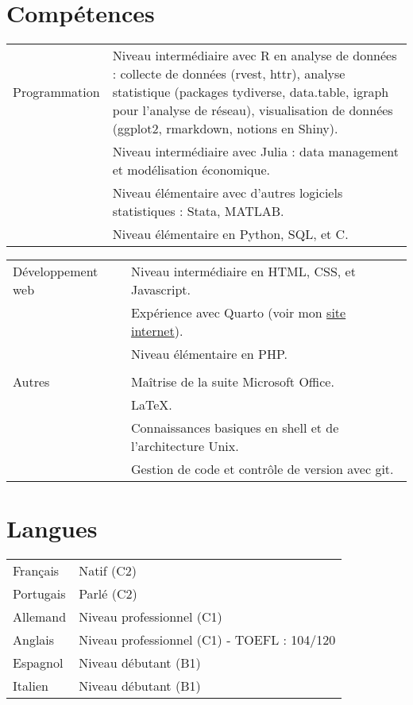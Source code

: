 \documentclass[a4paper,12pt]{article}
\begin{document}
\section{Compétences}
\begin{tabularx}{\linewidth}{@{}l X@{}}
Programmation \quad \quad & Niveau intermédiaire avec R en analyse de données :
collecte de données (rvest, httr),
analyse statistique (packages tydiverse, data.table, igraph pour l'analyse de réseau),
visualisation de données (ggplot2, rmarkdown, notions en Shiny). \\
& Niveau intermédiaire avec Julia : data management et modélisation économique.\\
& Niveau élémentaire avec d'autres logiciels statistiques : Stata, MATLAB. \\
& Niveau élémentaire en Python, SQL, et C. \\
\end{tabularx}
\begin{tabularx}{\linewidth}{@{}l X@{}}
Développement web &  Niveau intermédiaire en HTML, CSS, et Javascript. \\
& Expérience avec Quarto (voir mon \href{https://www.paulogcd.com}{site internet}). \\
& Niveau élémentaire en PHP.\\
& \\
Autres \quad \quad \quad \quad \quad \quad & Maîtrise de la suite Microsoft Office. \\
&  \LaTeX. \\
& Connaissances basiques en shell et de l'architecture Unix. \\
& Gestion de code et contrôle de version avec git.\\
\end{tabularx}

\section{Langues}
\begin{tabularx}{\linewidth}{@{}l X@{}}
Français &  \normalsize{Natif (C2)}\\
Portugais &  \normalsize{Parlé (C2)}\\
Allemand &  \normalsize{Niveau professionnel (C1)}\\  
Anglais &  \normalsize{Niveau professionnel (C1) - TOEFL : 104/120}\\ 
Espagnol & \normalsize{Niveau débutant (B1)}\\ 
Italien & \normalsize{Niveau débutant (B1)}\\ 
\end{tabularx}

\vfill
{}
\end{document}
